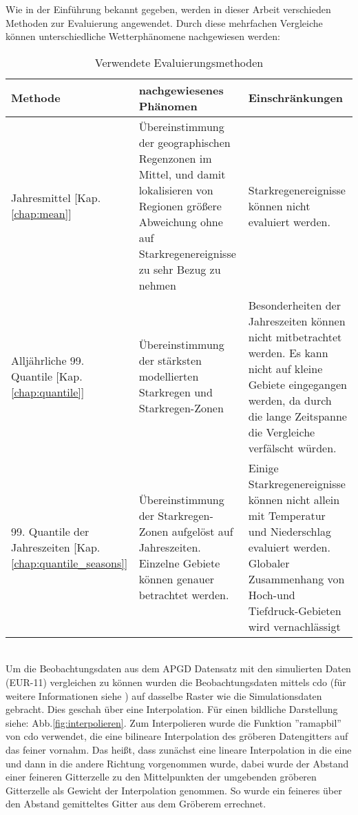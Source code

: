 Wie in der Einführung bekannt gegeben, werden in dieser Arbeit verschieden Methoden zur Evaluierung angewendet. Durch diese mehrfachen Vergleiche können unterschiedliche Wetterphänomene nachgewiesen werden:\\
\begin{table}[h!]
	\begin{tabularx}{\textwidth}{|X|X|X|}
		\hline
		\textbf{Methode} & \textbf{nachgewiesenes Phänomen}& \textbf{Einschränkungen}\\
		\hline
		Jahresmittel [Kap. \ref{chap:mean}] & Übereinstimmung der geographischen Regenzonen im Mittel, und damit lokalisieren von Regionen größere Abweichung ohne auf Starkregenereignisse zu sehr Bezug zu nehmen & Starkregenereignisse können nicht evaluiert werden.\\
		\hline
		Alljährliche 99. Quantile [Kap. \ref{chap:quantile}] & Übereinstimmung der stärksten modellierten Starkregen und Starkregen-Zonen & Besonderheiten der Jahreszeiten können nicht mitbetrachtet werden. Es kann nicht auf kleine Gebiete eingegangen werden, da durch die lange Zeitspanne die Vergleiche verfälscht würden.\\
		\hline
		99. Quantile der Jahreszeiten [Kap. \ref{chap:quantile_seasons}] & Übereinstimmung der Starkregen-Zonen aufgelöst auf Jahreszeiten. Einzelne Gebiete können genauer betrachtet werden. & Einige Starkregenereignisse können nicht allein mit Temperatur und Niederschlag evaluiert werden. Globaler Zusammenhang von Hoch-und Tiefdruck-Gebieten wird vernachlässigt\\
		\hline
	\end{tabularx}
\caption{Verwendete Evaluierungsmethoden}
\end{table}
\hfill\\
Um die Beobachtungsdaten aus dem APGD\cite{meteoswiss} Datensatz mit den simulierten Daten (EUR-11) vergleichen zu können wurden die Beobachtungsdaten mittels cdo (für weitere Informationen siehe \cite{cdo}) auf dasselbe Raster wie die Simulationsdaten gebracht. Dies geschah über eine Interpolation. Für einen bildliche Darstellung siehe: Abb.\ref{fig:interpolieren}. Zum Interpolieren wurde die Funktion ''ramapbil'' von cdo verwendet, die eine bilineare Interpolation des gröberen Datengitters auf das feiner vornahm. Das heißt, dass zunächst eine lineare Interpolation in die eine und dann in die andere Richtung vorgenommen wurde, dabei wurde der Abstand einer feineren Gitterzelle zu den Mittelpunkten der umgebenden gröberen Gitterzelle als Gewicht der Interpolation genommen. So wurde ein feineres über den Abstand gemitteltes Gitter aus dem Gröberem errechnet.\\
